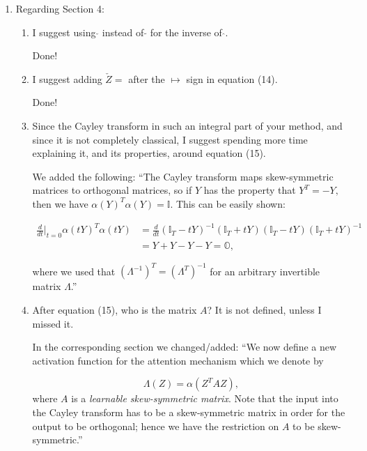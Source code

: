 \documentclass{article}
\begin{document}
\begin{enumerate}
\begin{enumerate}[label=\arabic*.]
\end{enumerate}

\item Regarding Section 4:
\begin{enumerate}[label=\arabic*.]
\item I suggest using $\check{}$ instead of $\tilde{}$ for the inverse of $\hat{}$.

    {\color{mred} Done!}
\item I suggest adding $\check{Z} =$ after the $\mapsto$ sign in equation (14).

    {\color{mred} Done!}
\item Since the Cayley transform in such an integral part of your method, and since it is not completely classical, I suggest spending more time explaining it, and its properties, around equation (15).

    {\color{mred} We added the following: ``The Cayley transform maps skew-symmetric matrices to orthogonal matrices, so if $Y$ has the property that $Y^T = -Y,$ then we have $\alpha(Y)^T\alpha(Y) = \mathbb{I}.$ This can be easily shown:

    \begin{equation*}
    \begin{aligned}
    \frac{d}{dt}\Big|_{t=0}\alpha(tY)^T\alpha(tY) & = \frac{d}{dt}(\mathbb{I}_{T} - tY)^{-1}(\mathbb{I}_{T} + tY)(\mathbb{I}_{T} - tY)(\mathbb{I}_{T} + tY)^{-1} \\
                                                  & = Y + Y - Y - Y = \mathbb{O},
    \end{aligned}
    \end{equation*}
    
    where we used that $(\Lambda^{-1})^T = (\Lambda^T)^{-1}$ for an arbitrary invertible matrix $\Lambda$.''}
\item After equation (15), who is the matrix $A$? It is not defined, unless I missed it.

    {\color{mred} In the corresponding section we changed/added: ``We now define a new activation function for the attention mechanism which we denote by 

    \begin{equation*}
    \Lambda(Z) = \alpha (Z^T A Z),
    \end{equation*}    
    where $A$ is a \textit{learnable skew-symmetric matrix}. Note that the input into the Cayley transform has to be a skew-symmetric matrix in order for the output to be orthogonal; hence we have the restriction on $A$ to be skew-symmetric.''}


\end{enumerate}
\end{enumerate}
\end{document}
